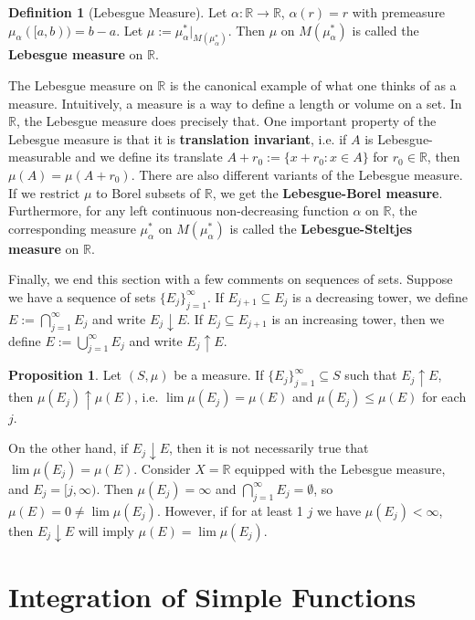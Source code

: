 \documentclass[11pt, oneside]{amsart}   	%
\theoremstyle{definition}
\newtheorem{definition}{Definition}[section]
\newtheorem{prop}{Proposition}[section]
\begin{document}
	\begin{definition}[Lebesgue Measure]
		Let $\alpha : \mathbb R\rightarrow\mathbb R$, $\alpha(r) = r$ with premeasure $\mu_\alpha([a, b)) = b - a$. Let 
		$\mu := \mu_\alpha^*|_{M(\mu_\alpha^*)}$. Then $\mu$ on $M(\mu_\alpha^*)$ is called the \textbf{Lebesgue 
		measure} on $\mathbb R$. 
	\end{definition}
	
	The Lebesgue measure on $\mathbb R$ is the canonical example of what one thinks of as a measure. Intuitively, a 
	measure is a way to define a length or volume on a set. In $\mathbb R$, the Lebesgue measure does precisely that. One 
	important property of the Lebesgue measure is that it is \textbf{translation invariant}, i.e. if $A$ is Lebesgue-measurable 
	and we define its translate $A + r_0 := \{x + r_0 : x\in A\}$ for $r_0\in\mathbb R$, then $\mu(A) = \mu(A + r_0)$. There are 
	also different variants of the Lebesgue measure. If we restrict $\mu$ to Borel subsets of $\mathbb R$, we get the 
	\textbf{Lebesgue-Borel measure}. Furthermore, for any left continuous non-decreasing function $\alpha$ on 
	$\mathbb R$, the corresponding measure $\mu_\alpha^*$ on $M(\mu_\alpha^*)$ is called the \textbf{Lebesgue-Steltjes 
	measure} on $\mathbb R$. 
	
	Finally, we end this section with a few comments on sequences of sets. Suppose we have a sequence of sets 
	$\{E_j\}_{j = 1}^\infty$. If $E_{j + 1}\subseteq E_j$ is a decreasing tower, we define $E := \bigcap_{j = 1}^\infty E_j$ and
	write $E_j\downarrow E$. If $E_j\subseteq E_{j + 1}$ is an increasing tower, then we define 
	$E := \bigcup_{j = 1}^\infty E_j$ and write $E_j\uparrow E$.
	
	\begin{prop}
		Let $(S, \mu)$ be a measure. If $\{E_j\}_{j = 1}^\infty\subseteq S$ such that $E_j\uparrow E$, then 
		$\mu(E_j)\uparrow\mu(E)$, i.e. $\lim\mu(E_j) = \mu(E)$ and $\mu(E_j)\leq\mu(E)$ for each $j$. 
	\end{prop}
	
	On the other hand, if $E_j\downarrow E$, then it is not necessarily true that $\lim\mu(E_j) = \mu(E)$. Consider $X = 
	\mathbb R$ equipped with the Lebesgue measure, and $E_j = [j, \infty)$. Then $\mu(E_j) = \infty$ and 
	$\bigcap_{j = 1}^\infty E_j = \emptyset$, so $\mu(E) = 0\neq\lim\mu(E_j)$. However, if for at least 1 $j$ we have $\mu(E_j) < 
	\infty$, then $E_j\downarrow E$ will imply $\mu(E) = \lim\mu(E_j)$. 
	
\section{Integration of Simple Functions}
	
\end{document}
